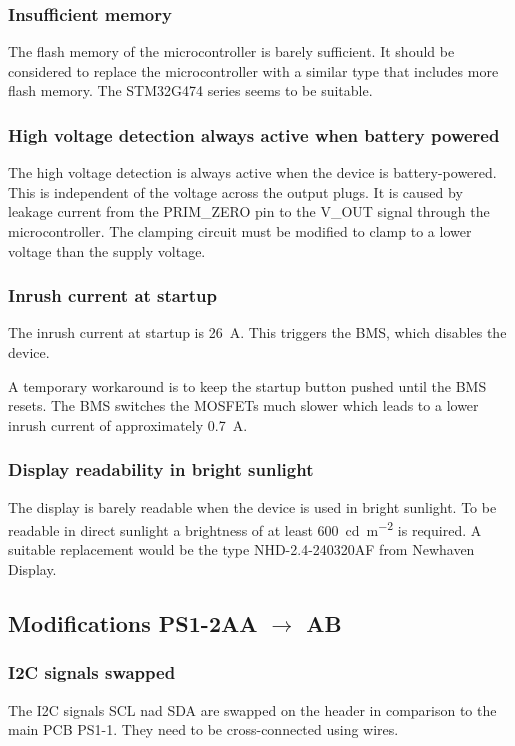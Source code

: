 \subsubsection{Insufficient memory}
The flash memory of the microcontroller is barely sufficient. It should be considered to replace the microcontroller with a similar type that includes more flash memory. The STM32G474 series seems to be suitable. 

\subsubsection{High voltage detection always active when battery powered}
The high voltage detection is always active when the device is battery-powered. This is independent of the voltage across the output plugs. It is caused by leakage current from the PRIM\_ZERO pin to the V\_OUT signal through the microcontroller. 
The clamping circuit must be modified to clamp to a lower voltage than the supply voltage. 

\subsubsection{Inrush current at startup}
The inrush current at startup is \qty{26}{\ampere}. This triggers the BMS, which disables the device. 

A temporary workaround is to keep the startup button pushed until the BMS resets. The BMS switches the \acp{MOSFET} much slower which leads to a lower inrush current of approximately \qty{0.7}{\ampere}. 


\subsubsection{Display readability in bright sunlight}
The display is barely readable when the device is used in bright sunlight. To be readable in direct sunlight a brightness of at least \qty{600}{\candela\per\square\meter} is required. A suitable replacement would be the type NHD-2.4-240320AF from Newhaven Display. 

\subsection{Modifications PS1-2AA $\to$ AB}

\subsubsection{\acs{I2C} signals swapped}
The \ac{I2C} signals SCL nad SDA are swapped on the header in comparison to the main PCB PS1-1. They need to be cross-connected using wires. 


